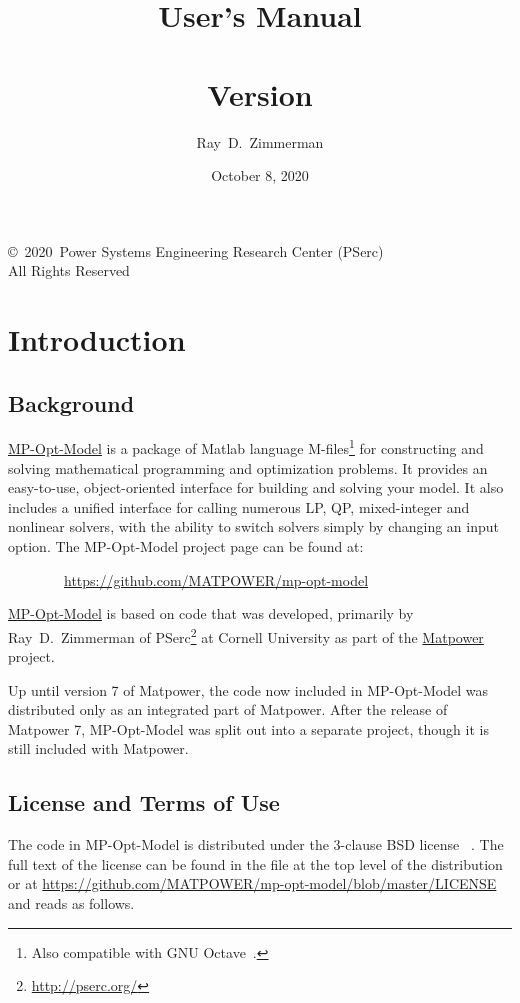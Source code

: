 \documentclass[12pt]{article}
\title{{\huge \bfseries \mpomname{} User's Manual } \\ ~ \\ \LARGE Version \mpomver{}}
\author{Ray~D.~Zimmerman}
\date{October 8, 2020} %
\newcommand{\matlab}[0]{{\sc Matlab}}
\newcommand{\matpower}[0]{{\sc Matpower}}
\newcommand{\matpowerurl}[0]{https://matpower.org}
\newcommand{\matpowerlink}[0]{\href{\matpowerurl}{\matpower{}}}
\newcommand{\mpom}[0]{\mbox{MP-Opt-Model}}
\newcommand{\mpomurl}[0]{https://github.com/MATPOWER/mp-opt-model}
\newcommand{\mpomlink}[0]{\href{\mpomurl}{\mpom{}}}
\newcommand{\pserc}[0]{{\sc PSerc}}
\newcommand{\PSERC}[0]{{Power Systems Engineering Research Center (\pserc{})}}
\newcommand{\code}[1]{{\relsize{-0.5}{\tt{{#1}}}}}  %
\numberwithin{equation}{section}
\numberwithin{table}{section}
\numberwithin{figure}{section}
\begin{document}
\maketitle
\thispagestyle{empty}
\vfill
\begin{center}
{\scriptsize
\copyright~2020~\PSERC{}\\
All Rights Reserved}
\end{center}

\clearpage
\tableofcontents
\clearpage
\listoftables

\clearpage
\section{Introduction}

\subsection{Background}

\mpomlink{} is a package of \matlab{} language M-files\footnote{Also compatible with GNU Octave~\cite{octave}.} for constructing and solving mathematical programming and optimization problems. It provides an easy-to-use, object-oriented interface for building and solving your model. It also includes a unified interface for calling numerous LP, QP, mixed-integer and nonlinear solvers, with the ability to switch solvers simply by changing an input option.
The \mpom{} project page can be found at:

\bigskip

~~~~~~~~\url{\mpomurl}

\bigskip

\mpomlink{} is based on code that was developed, primarily by Ray~D.~Zimmerman of \pserc{}\footnote{\url{http://pserc.org/}} at Cornell University as part of the \matpowerlink{}~\cite{zimmerman2011,matpower} project.

Up until version 7 of \matpower{}, the code now included in \mpom{} was distributed only as an integrated part of \matpower{}. After the release of \matpower{} 7, \mpom{} was split out into a separate project, though it is still included with \matpower{}.

\clearpage
\subsection{License and Terms of Use}

The code in \mpom{} is distributed under the 3-clause BSD license
~\cite{bsd}. The full text of the license can be found in the \code{LICENSE} file at the top level of the distribution or at \url{https://github.com/MATPOWER/mp-opt-model/blob/master/LICENSE} and reads as follows.
\end{document}
